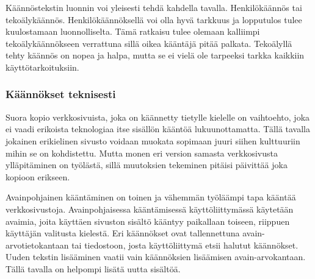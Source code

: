 \documentclass[11pt,a4paper,titlepage,oneside]{article}
\begin{document}
Käännöstekstin luonnin voi yleisesti tehdä kahdella tavalla. Henkilökäännös tai tekoälykäännös.
Henkilökäännöksellä voi olla hyvä tarkkuus ja lopputulos tulee kuulostamaan luonnolliselta.
Tämä ratkaisu tulee olemaan kalliimpi tekoälykäännökseen verrattuna sillä oikea kääntäjä pitää palkata.
Tekoälyllä tehty käännös on nopea ja halpa, mutta se ei vielä ole tarpeeksi tarkka kaikkiin käyttötarkoituksiin.
\medskip









\subsubsection{Käännökset teknisesti}





Suora kopio verkkosivuista, joka on käännetty tietylle kielelle
on vaihtoehto, joka ei vaadi erikoista teknologiaa itse sisällön kääntöä lukuunottamatta.
Tällä tavalla jokainen erikielinen sivusto voidaan muokata sopimaan juuri siihen kulttuuriin mihin se on kohdistettu.
Mutta monen eri version samasta verkkosivusta ylläpitäminen on työlästä, sillä muutoksien tekeminen pitäisi päivittää joka kopioon erikseen.
\medskip



Avainpohjainen kääntäminen on toinen ja vähemmän työläämpi tapa kääntää verkkosivustoja.
Avainpohjaisessa kääntämisessä käyttöliittymässä käytetään avaimia, joita käyttäen sivuston sisältö kääntyy paikallaan toiseen, 
riippuen käyttäjän valitusta kielestä.
%
Eri käännökset ovat tallennettuna 
avain-arvotietokantaan tai tiedostoon,
josta käyttöliittymä etsii halutut käännökset.
Uuden tekstin lisääminen vaatii vain käännöksien lisäämisen avain-arvokantaan.
Tällä tavalla on helpompi lisätä uutta sisältöä.
\medskip
\end{document}
